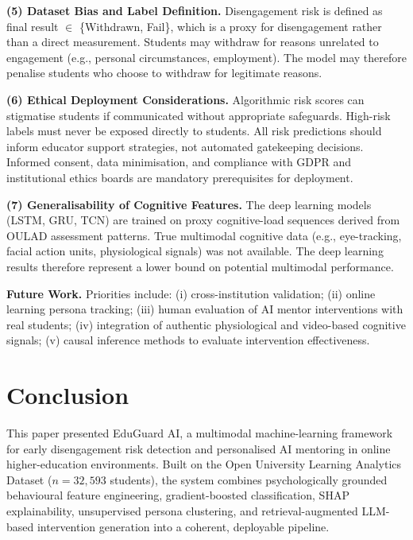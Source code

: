\textbf{(5) Dataset Bias and Label Definition.}
Disengagement risk is defined as final result $\in$ \{Withdrawn, Fail\},
which is a proxy for disengagement rather than a direct measurement.
Students may withdraw for reasons unrelated to engagement (e.g.,
personal circumstances, employment). The model may therefore penalise
students who choose to withdraw for legitimate reasons.

\textbf{(6) Ethical Deployment Considerations.}
Algorithmic risk scores can stigmatise students if communicated without
appropriate safeguards. High-risk labels must never be exposed directly
to students. All risk predictions should inform educator support
strategies, not automated gatekeeping decisions. Informed consent,
data minimisation, and compliance with GDPR and institutional ethics
boards are mandatory prerequisites for deployment.

\textbf{(7) Generalisability of Cognitive Features.}
The deep learning models (LSTM, GRU, TCN) are trained on proxy
cognitive-load sequences derived from OULAD assessment patterns.
True multimodal cognitive data (e.g., eye-tracking, facial action units,
physiological signals) was not available. The deep learning results
therefore represent a lower bound on potential multimodal performance.

\textbf{Future Work.}
Priorities include: (i) cross-institution validation; (ii) online
learning persona tracking; (iii) human evaluation of AI mentor
interventions with real students; (iv) integration of authentic
physiological and video-based cognitive signals; (v) causal inference
methods to evaluate intervention effectiveness.



\section{Conclusion}
\label{sec:conclusion}

This paper presented EduGuard AI, a multimodal machine-learning framework
for early disengagement risk detection and personalised AI mentoring
in online higher-education environments. Built on the Open University
Learning Analytics Dataset ($n = 32{,}593$ students), the system
combines psychologically grounded behavioural feature engineering,
gradient-boosted classification, SHAP explainability, unsupervised
persona clustering, and retrieval-augmented LLM-based intervention
generation into a coherent, deployable pipeline.

